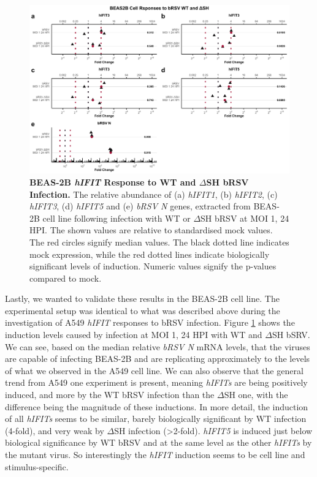 \begin{figure}
    \centering
    \includegraphics[width=1\linewidth]{06. Chapter 1/Figs/01. Induction/11. beas2b_brsv_moi1.pdf}
    \caption[BEAS-2B \textit{hIFIT} Response to WT and \(\Delta\)SH bRSV Infection.]{\textbf{BEAS-2B \textit{hIFIT} Response to WT and \(\Delta\)SH bRSV Infection.} The relative abundance of (a) \textit{hIFIT1}, (b) \textit{hIFIT2}, (c) \textit{hIFIT3}, (d) \textit{hIFIT5} and (e) \textit{bRSV N} genes, extracted from BEAS-2B cell line following infection with WT or \(\Delta\)SH bRSV at MOI 1, 24 HPI.  The shown values are relative to standardised mock values. The red circles signify median values. The black dotted line indicates mock expression, while the red dotted lines indicate biologically significant levels of induction. Numeric values signify the p-values compared to mock.}
    \label{BEAS-2B responses to bRSV WT and dSH.}
\end{figure}


Lastly, we wanted to validate these results in the BEAS-2B cell line. The experimental setup was identical to what was described above during the investigation of A549 \textit{hIFIT} responses to bRSV infection. Figure \ref{BEAS-2B responses to bRSV WT and dSH.} shows the induction levels caused by infection at MOI 1, 24 HPI with WT and \(\Delta\)SH bSRV. We can see, based on the median relative \textit{bRSV N} mRNA levels, that the viruses are capable of infecting BEAS-2B and are replicating approximately to the levels of what we observed in the A549 cell line. We can also observe that the general trend from A549 one experiment is present, meaning \textit{hIFITs} are being positively induced, and more by the WT bRSV infection than the \(\Delta\)SH one, with the difference being the magnitude of these inductions. In more detail, the induction of all \textit{hIFITs} seems to be similar, barely biologically significant by WT infection (4-fold), and very weak by \(\Delta\)SH infection (>2-fold). \textit{hIFIT5} is induced just below biological significance by WT bRSV and at the same level as the other \textit{hIFITs} by the mutant virus. So interestingly the \textit{hIFIT} induction seems to be cell line and stimulus-specific.


